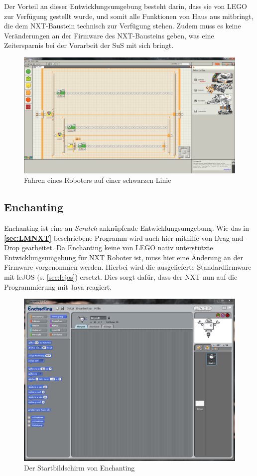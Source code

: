 \documentclass[paper=a4, pagesize, DIV=calc, BCOR=12.5mm, twoside=on, onecolumn=on, open = any, titlepage =on, parskip =half-, headsepline = on, footsepline = on, chapterprefix = on, appendixprefix = off, fontsize = 12pt, numbers = noenddot, abstract = on]{scrbook}
\numberwithin{equation}{chapter}
\theoremstyle{definition}
\theoremstyle{plain}
\theoremstyle{plain}
\theoremstyle{remark}
\theoremstyle{plain}
\theoremstyle{plain}
\begin{document}
Der Vorteil an dieser Entwicklungsumgebung besteht darin, dass sie von LEGO zur Verfügung gestellt wurde, und somit alle Funktionen von Haus aus mitbringt, die dem NXT-Baustein technisch zur Verfügung stehen. Zudem muss es keine Veränderungen an der Firmware des NXT-Bausteins geben, was eine Zeitersparnis bei der Vorarbeit der SuS mit sich bringt.
\begin{figure}[htbp]
\centering
\includegraphics[scale=0.282]{images/Beispielprogramm_NXT.png} 
\caption{Fahren eines Roboters auf einer schwarzen Linie}
\label{fig:Bsp NXT}
\end{figure}

\subsection{Enchanting}
\label{sec:enchanting}
Enchanting ist eine an \emph{Scratch} anknüpfende Entwicklungsumgebung. Wie das in \textbf{\ref{sec:LMNXT}} beschriebene Programm wird auch hier mithilfe von Drag-and-Drop gearbeitet. Da Enchanting keine von LEGO nativ unterstützte Entwicklungsumgebung für NXT Roboter ist, muss hier eine Änderung an der Firmware vorgenommen werden. Hierbei wird die ausgelieferte Standardfirmware mit leJOS (s. \ref{sec:lejos}) ersetzt. Dies sorgt dafür, dass der NXT nun auf die Programmierung mit Java reagiert.\\
\begin{figure}[H]
\centering
\includegraphics[scale=0.5]{images/Enchanting_Start.png} 
\caption{Der Startbildschirm von Enchanting}
\label{fig:Enchanting Start}
\end{figure}
\end{document}
